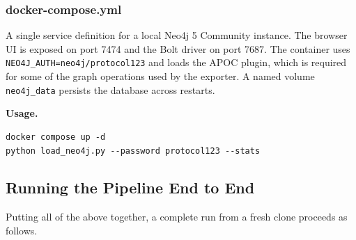 \documentclass{article}
\begin{document}
\subsubsection{docker-compose.yml}

A single service definition for a local Neo4j 5 Community instance.
The browser UI is exposed on port 7474 and the Bolt driver on port
7687. The container uses \texttt{NEO4J\_AUTH=neo4j/protocol123} and
loads the APOC plugin, which is required for some of the graph
operations used by the exporter. A named volume \texttt{neo4j\_data}
persists the database across restarts.

\textbf{Usage.}

\begin{tcolorbox}[colback=mygray, colframe=mygray, sharp corners, boxrule=0pt]
\begin{verbatim}
docker compose up -d
python load_neo4j.py --password protocol123 --stats
\end{verbatim}
\end{tcolorbox}

\subsection{Running the Pipeline End to End}

Putting all of the above together, a complete run from a fresh clone
proceeds as follows.
\end{document}
